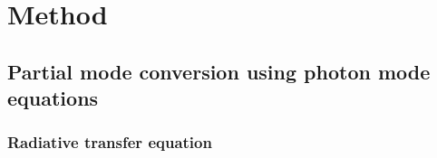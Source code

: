 \documentclass[useAMS,onecolumn,usenatbib,usegraphicx]{mn2e}
\begin{document}

\section{Method}
\label{sect:Method}

\subsection{Partial mode conversion using photon mode equations}
\label{subsect:Modes}

\subsubsection{Radiative transfer equation}
\label{subsubsect:PModeRTE}
\end{document}
